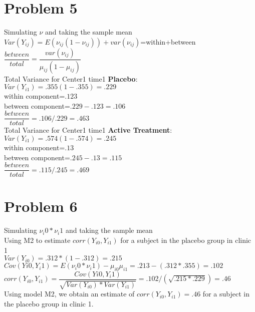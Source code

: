 \documentclass{article}
\begin{document}
\begin{flushleft}
\section*{Problem 5}
Simulating $\nu$ and taking the sample mean\\
$Var(Y_{ij})=E(\nu_{ij}(1-\nu_{ij}))+var(\nu_{ij})$=within+between\\
$\dfrac{between}{total}=\dfrac{var(\nu_{ij})}{\mu_{ij}(1-\mu_{ij})}$\\
Total Variance for Center1 time1 \textbf{Placebo}:\\
$Var(Y_{i1})=.355(1-.355)=.229$\\
within component=$.123$\\
between component=$.229-.123=.106$\\
$\dfrac{between}{total}=.106/.229=.463$\\
Total Variance for Center1 time1 \textbf{Active Treatment}:\\
$Var(Y_{i1})=.574(1-.574)=.245$\\
within component=$.13$\\
between component=$.245-.13=.115$\\
$\dfrac{between}{total}=.115/.245=.469$
\section*{Problem 6}
Simulating $\nu_i0*\nu_i1$ and taking the sample mean\\
Using M2 to estimate  $corr(Y_{i0},Y_{i1})$ for a subject in the placebo group in clinic 1\\
$Var(Y_{i0})=.312*(1-.312)=.215$\\
$Cov(Y{i0},Y_i1)=E(\nu_i0*\nu_i1)-\mu_{i0}\mu_{i1}=.213-(.312*.355)=.102$\\
$corr(Y_{i0},Y_{i1})=\dfrac{Cov(Y{i0},Y_i1)}{\sqrt{Var(Y_{i0})*Var(Y_{i1})}}=.102/(\sqrt{.215*.229})=.46$\\
Using model M2, we obtain an estimate of $corr(Y_{i0},Y_{i1})=.46$ for a subject in the placebo group in clinic 1.
\end{flushleft}
\end{document}
